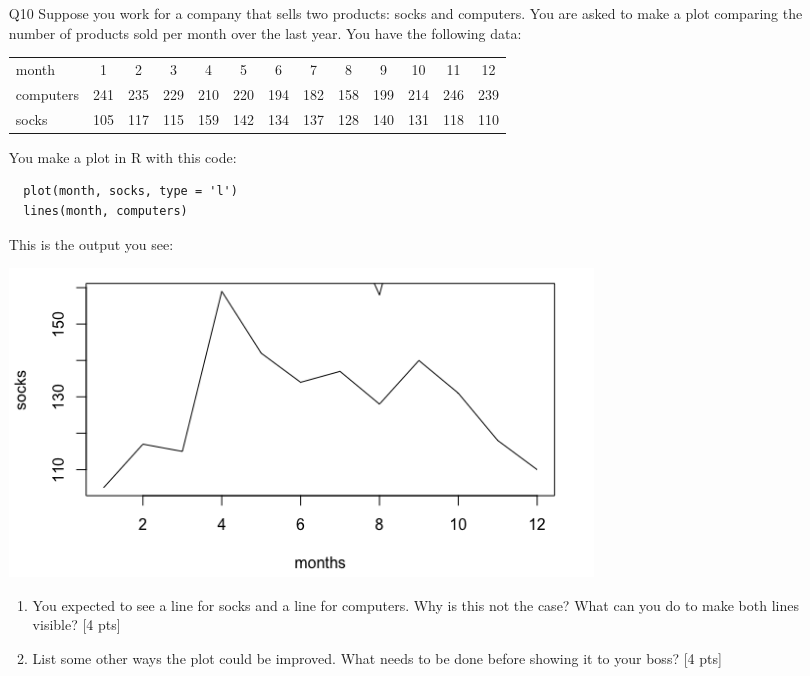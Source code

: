 \documentclass[12pt]{article}
\theoremstyle{Conjecture}
\theoremstyle{example}
\theoremstyle{remark}
\theoremstyle{lemma}
\theoremstyle{definition}
\theoremstyle{corol}
\theoremstyle{proposition}
\theoremstyle{condition}
\begin{document}
\begin{enumerate}
\newpage 
\item [Q10] Suppose you work for a company that sells two products: socks and computers. You are asked to make a plot comparing the number of products sold per month over the last year. You have the following data:

\begin{tabular}{lcccccccccccc}
month & 1 & 2 & 3 & 4 & 5 & 6 & 7 & 8 & 9 & 10 & 11 & 12 \\
computers & 241 & 235 & 229 & 210 & 220 & 194 & 182 & 158 & 199 & 214 & 246 & 239 \\
socks & 105 & 117 & 115 & 159 & 142 & 134 & 137 & 128 & 140 & 131 & 118 & 110
\end{tabular}

You make a plot in R with this code:
\vspace{-0.2in}
\begin{verbatim}
  plot(month, socks, type = 'l')
  lines(month, computers)
\end{verbatim}
\vspace{-0.2in}
This is the output you see:
\begin{center}
  \includegraphics[width=0.7\textwidth]{plot.png}
\end{center}
\begin{enumerate}
  \item You expected to see a line for socks and a line for computers. Why is this not the case? What can you do to make both lines visible? [4 pts]
  \vspace{1in}
  \item List some other ways the plot could be improved. What needs to be done before showing it to your boss? [4 pts]
\end{enumerate}

\end{enumerate}
\end{document}
